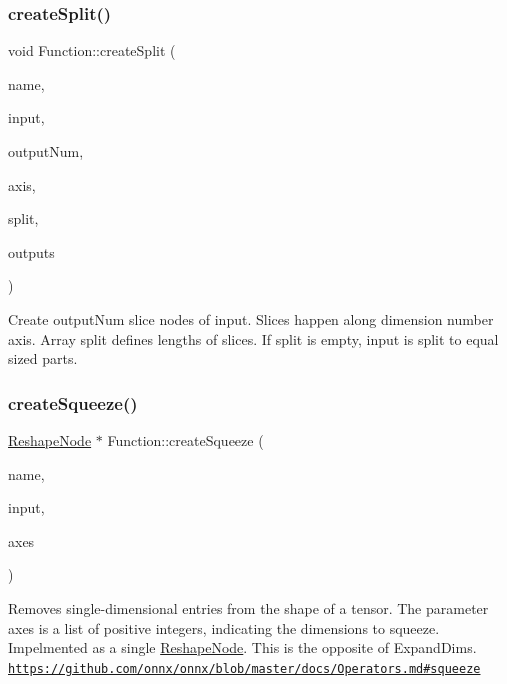\subsubsection{\texorpdfstring{create\+Split()}{createSplit()}}
{\footnotesize\ttfamily void Function\+::create\+Split (\begin{DoxyParamCaption}\item[{llvm\+::\+String\+Ref}]{name,  }\item[{\hyperlink{structglow_1_1_node_value}{Node\+Value}}]{input,  }\item[{\hyperlink{namespaceglow_a0ca574644e1e42ef193a9947fb4d8911}{unsigned\+\_\+t}}]{output\+Num,  }\item[{\hyperlink{namespaceglow_a0ca574644e1e42ef193a9947fb4d8911}{unsigned\+\_\+t}}]{axis,  }\item[{llvm\+::\+Array\+Ref$<$ size\+\_\+t $>$}]{split,  }\item[{std\+::vector$<$ \hyperlink{classglow_1_1_slice_node}{Slice\+Node} $\ast$$>$ \&}]{outputs }\end{DoxyParamCaption})}

Create {\ttfamily output\+Num} slice nodes of {\ttfamily input}. Slices happen along dimension number {\ttfamily axis}. Array {\ttfamily split} defines lengths of slices. If {\ttfamily split} is empty, {\ttfamily input} is split to equal sized parts. \mbox{\label{classglow_1_1_function_a5fa046629fa2f742a28a49966c67e947}} 
\subsubsection{\texorpdfstring{create\+Squeeze()}{createSqueeze()}}
{\footnotesize\ttfamily \hyperlink{classglow_1_1_reshape_node}{Reshape\+Node} $\ast$ Function\+::create\+Squeeze (\begin{DoxyParamCaption}\item[{llvm\+::\+String\+Ref}]{name,  }\item[{\hyperlink{structglow_1_1_node_value}{Node\+Value}}]{input,  }\item[{llvm\+::\+Array\+Ref$<$ size\+\_\+t $>$}]{axes }\end{DoxyParamCaption})}

Removes single-\/dimensional entries from the shape of a tensor. The parameter {\ttfamily axes} is a list of positive integers, indicating the dimensions to squeeze. Impelmented as a single \hyperlink{classglow_1_1_reshape_node}{Reshape\+Node}. This is the opposite of Expand\+Dims. \href{https://github.com/onnx/onnx/blob/master/docs/Operators.md#squeeze}{\tt https\+://github.\+com/onnx/onnx/blob/master/docs/\+Operators.\+md\#squeeze} \mbox{\label{classglow_1_1_function_a859e8e441d4479750853cca69c357803}} 

